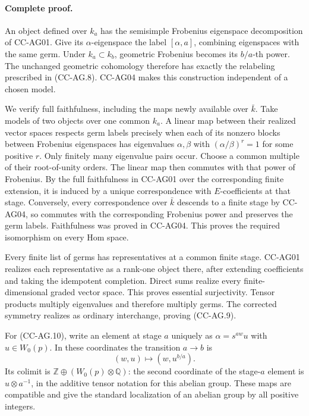\documentclass[11pt,a4paper]{article}
\theoremstyle{definition}\newtheorem{definition}[theorem]{Definition}
\theoremstyle{remark}\newtheorem{remark}[theorem]{Remark}
\begin{document}
\paragraph{Complete proof.}
An object defined over \(k_a\) has the semisimple Frobenius
eigenspace decomposition of CC-AG01. Give its \(\alpha\)-eigenspace
the label \([\alpha,a]\), combining eigenspaces with the same germ.
Under \(k_a\subset k_b\), geometric Frobenius becomes its
\(b/a\)-th power. The unchanged geometric cohomology therefore
has exactly the relabeling prescribed in (CC-AG.8).
CC-AG04 makes this construction independent of a chosen model.

We verify full faithfulness, including the maps newly available
over \(\bar k\). Take models of two objects over one common \(k_a\).
A linear map between their realized vector spaces respects germ
labels precisely when each of its nonzero blocks between
Frobenius eigenspaces has eigenvalues \(\alpha,\beta\) with
\((\alpha/\beta)^r=1\) for some positive \(r\). Only finitely many
eigenvalue pairs occur. Choose a common multiple of their
root-of-unity orders. The linear map then commutes with that
power of Frobenius. By the full faithfulness in CC-AG01 over the
corresponding finite extension, it is induced by a unique
correspondence with \(E\)-coefficients at that stage. Conversely,
every correspondence over \(\bar k\) descends to a finite stage
by CC-AG04, so commutes with the corresponding Frobenius power
and preserves the germ labels. Faithfulness was proved in
CC-AG04. This proves the required isomorphism on every Hom space.

Every finite list of germs has representatives at a common finite
stage. CC-AG01 realizes each representative as a rank-one object
there, after extending coefficients and taking the idempotent
completion. Direct sums realize every finite-dimensional graded
vector space. This proves essential surjectivity. Tensor products
multiply eigenvalues and therefore multiply germs. The corrected
symmetry realizes as ordinary interchange, proving (CC-AG.9).

For (CC-AG.10), write an element at stage \(a\) uniquely as
\(\alpha=s^{aw}u\) with \(u\in W_0(p)\). In these coordinates the
transition \(a\to b\) is
\[
 (w,u)\longmapsto(w,u^{b/a}).
\]
Its colimit is \(\mathbb Z\oplus(W_0(p)\otimes\mathbb Q)\):
the second coordinate of the stage-\(a\) element is
\(u\otimes a^{-1}\), in the additive tensor notation for this
abelian group. These maps are compatible and give the standard
localization of an abelian group by all positive integers.
\end{document}
